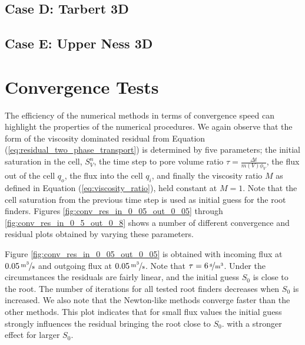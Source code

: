 \subsection{Case D: Tarbert 3D}
\label{section:caseD}


\clearpage
\subsection{Case E: Upper Ness 3D}
\label{section:caseE}


\clearpage
\section{Convergence Tests}
\label{section:numerical_results_convergence_tests}
The efficiency of the numerical methods in terms of convergence speed can highlight the properties of the numerical procedures. We again  observe that the form of the viscosity dominated residual from Equation (\ref{eq:residual_two_phase_transport}) is determined by five parameters; the initial saturation in the cell, $S_V^{n}$, the time step to pore volume ratio $\tau = \frac{\Delta t}{m(V)\phi_V}$, the flux out of the cell $q_o$, the flux into the cell $q_i$, and finally the viscosity ratio $M$ as defined in Equation (\ref{eq:viscosity_ratio}), held constant at $M = 1$. Note that the cell saturation from the previous time step is used as initial guess for the root finders. Figures \ref{fig:conv_res_in_0_05_out_0_05} through \ref{fig:conv_res_in_0_5_out_0_8} shows a number of different convergence and residual plots obtained by varying these parameters. 

Figure \ref{fig:conv_res_in_0_05_out_0_05} is obtained with incoming flux at $\unitfrac[0.05]{m^3}{s}$ and outgoing flux at $\unitfrac[0.05]{m^3}{s}$. Note that $\tau = \unitfrac[6]{s}{m^3}$. Under the circumstances the residuals are fairly linear, and the initial guess $S_0$ is close to the root. The number of iterations for all tested root finders decreases when $S_0$ is increased. We also note that the Newton-like methods converge faster than the other methods. This plot indicates that for small flux values the initial guess strongly influences the residual bringing the root close to $S_0$. with a stronger effect for larger $S_0$. 

